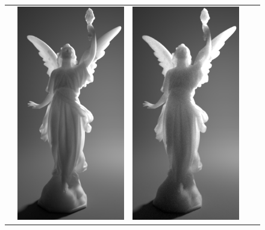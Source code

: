 \begin{figure}
\begin{tabular}{ccccc}
		\raisebox{\raiseLen}{\rotatebox[origin=c]{90}{$\radius_i=500\text{nm}$}} &
		\includegraphics[height=\resLen]{images/lucy/N1_500nm.jpg} &
		\includegraphics[height=\resLen]{images/lucy/N50_500nm.jpg} &

\end{tabular}
\end{figure}
